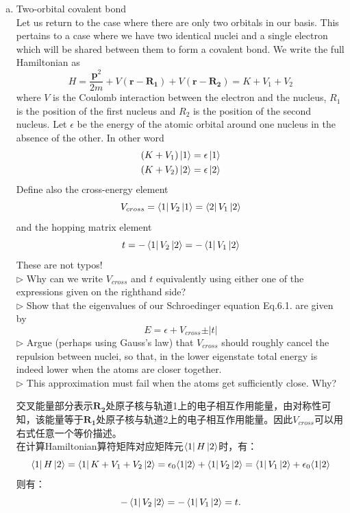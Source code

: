 \documentclass[reqno,a4paper,12pt]{amsart}
\begin{document}
\begin{enumerate}[(a)]
	\item Two-orbital covalent bond \\
	Let us return to the case where there are only two orbitals in our basis. This pertains to a case where we have two identical nuclei and a single electron which will be shared between them to form a covalent bond. We write the full Hamiltonian as 
	\[
		H = \frac{\mathbf{p}^2}{2m} + V(\mathbf{r} - \mathbf{R_1}) + V(\mathbf{r} - \mathbf{R_2}) = K + V_1 + V_2
	\]
	where $V$ is the Coulomb interaction between the electron and the nucleus, $R_1$ is the position of the first nucleus and $R_2$ is the position of the second nucleus. Let $\epsilon$ be the energy of the atomic orbital around one nucleus in the absence of the other. In other word 
	\begin{align*}
		(K+V_1) \ket{1} &= \epsilon \ket{1} \\
		(K+V_2) \ket{2} &= \epsilon \ket{2}
	\end{align*}
	Define also the cross-energy element 
	\[
		V_{cross} = \bra{1} V_2 \ket{1} = \bra{2} V_1 \ket{2}
	\]
	and the hopping matrix element 
	\[
		t = -\bra{1} V_2 \ket{2} = - \bra{1} V_1 \ket{2}
	\]
	These are not typos! \\
	$\triangleright$ Why can we write $V_{cross}$ and $t$ equivalently using either one of the expressions given on the righthand side? \\
	$\triangleright$ Show that the eigenvalues of our Schroedinger equation Eq.6.1. are given by 
	\[
		E = \epsilon +V_{cross} \pm \vert t \vert
	\]
	$\triangleright$ Argue (perhaps using Gauss's law) that $V_{cross}$ should roughly cancel the repulsion between nuclei, so that, in the lower eigenstate total energy is indeed lower when the atoms are closer together. \\
	$\triangleright$ This approximation must fail when the atoms get sufficiently close. Why?
	\begin{tcolorbox}[breakable, colback = black!5!white, colframe = black]
	交叉能量部分表示$\mathbf{R_2}$处原子核与轨道1上的电子相互作用能量，由对称性可知，该能量等于$\mathbf{R_1}$处原子核与轨道2上的电子相互作用能量。因此$V_{cross}$可以用右式任意一个等价描述。 \\
	在计算Hamiltonian算符矩阵对应矩阵元$\bra{1} H \ket{2}$时，有：
	\[
		\bra{1} H \ket{2} = \bra{1} K + V_1 + V_2 \ket{2} = \epsilon_0 \langle 1 \vert 2 \rangle + \bra{1} V_2 \ket{2} = \bra{1} V_1 \ket{2} + \epsilon_0 \langle 1 \vert 2 \rangle
	\]
	则有：
	\[
		-\bra{1} V_2 \ket{2} = -\bra{1} V_1 \ket{2} = t.
	\]

\end{tcolorbox}
\end{enumerate}
\end{document}
